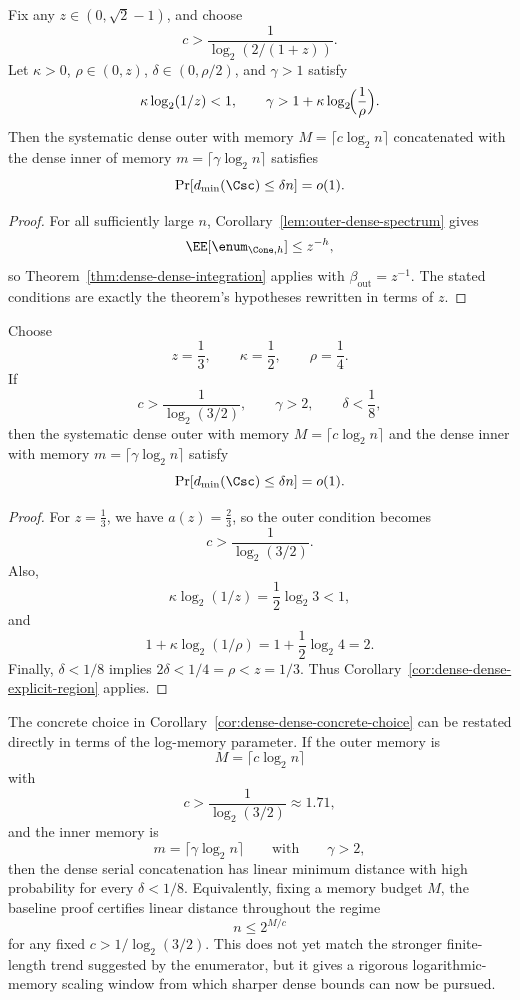 \begin{corollary}
\label{cor:dense-dense-explicit-region}
Fix any \(z\in(0,\sqrt2-1)\), and choose
\[
c>\frac{1}{\log_2(2/(1+z))}.
\]
Let \(\kappa>0\), \(\rho\in(0,z)\), \(\delta\in(0,\rho/2)\), and \(\gamma>1\) satisfy
\[
\kappa\log_2(1/z)<1,
\qquad
\gamma>1+\kappa\log_2\!\Bigl(\frac{1}{\rho}\Bigr).
\]
Then the systematic dense outer with memory \(M=\lceil c\log_2 n\rceil\) concatenated with the dense inner of memory
\(m=\lceil \gamma\log_2 n\rceil\) satisfies
\[
\Pr[d_{\min}(\Csc)\le \delta n]=o(1).
\]
\end{corollary}

\begin{proof}
For all sufficiently large \(n\), Corollary~\ref{lem:outer-dense-spectrum} gives
\[
\EE[\enum_{\Cone,h}] \le z^{-h},
\]
so Theorem~\ref{thm:dense-dense-integration} applies with \(\beta_{\mathrm{out}}=z^{-1}\).
The stated conditions are exactly the theorem's hypotheses rewritten in terms of \(z\).
\end{proof}

\begin{corollary}
\label{cor:dense-dense-concrete-choice}
Choose
\[
z=\frac13,
\qquad
\kappa=\frac12,
\qquad
\rho=\frac14.
\]
If
\[
c>\frac{1}{\log_2(3/2)},
\qquad
\gamma>2,
\qquad
\delta<\frac18,
\]
then the systematic dense outer with memory \(M=\lceil c\log_2 n\rceil\) and the dense inner with memory
\(m=\lceil \gamma\log_2 n\rceil\) satisfy
\[
\Pr[d_{\min}(\Csc)\le \delta n]=o(1).
\]
\end{corollary}

\begin{proof}
For \(z=\tfrac13\), we have \(a(z)=\tfrac23\), so the outer condition becomes
\[
c>\frac{1}{\log_2(3/2)}.
\]
Also,
\[
\kappa\log_2(1/z)=\frac12\log_2 3<1,
\]
and
\[
1+\kappa\log_2(1/\rho)
=
1+\frac12\log_2 4
=2.
\]
Finally, \(\delta<1/8\) implies \(2\delta<1/4=\rho<z=1/3\).
Thus Corollary~\ref{cor:dense-dense-explicit-region} applies.
\end{proof}

\begin{remark}
\label{rem:dense-dense-memory-scaling}
The concrete choice in Corollary~\ref{cor:dense-dense-concrete-choice} can be restated directly in terms of the
log-memory parameter.
If the outer memory is
\[
M=\lceil c\log_2 n\rceil
\]
with
\[
c>\frac{1}{\log_2(3/2)}\approx 1.71,
\]
and the inner memory is
\[
m=\lceil \gamma\log_2 n\rceil
\qquad\text{with}\qquad \gamma>2,
\]
then the dense serial concatenation has linear minimum distance with high probability for every \(\delta<1/8\).
Equivalently, fixing a memory budget \(M\), the baseline proof certifies linear distance throughout the regime
\[
n \le 2^{M/c}
\]
for any fixed \(c>1/\log_2(3/2)\).
This does not yet match the stronger finite-length trend suggested by the enumerator, but it gives a rigorous
logarithmic-memory scaling window from which sharper dense bounds can now be pursued.
\end{remark}

